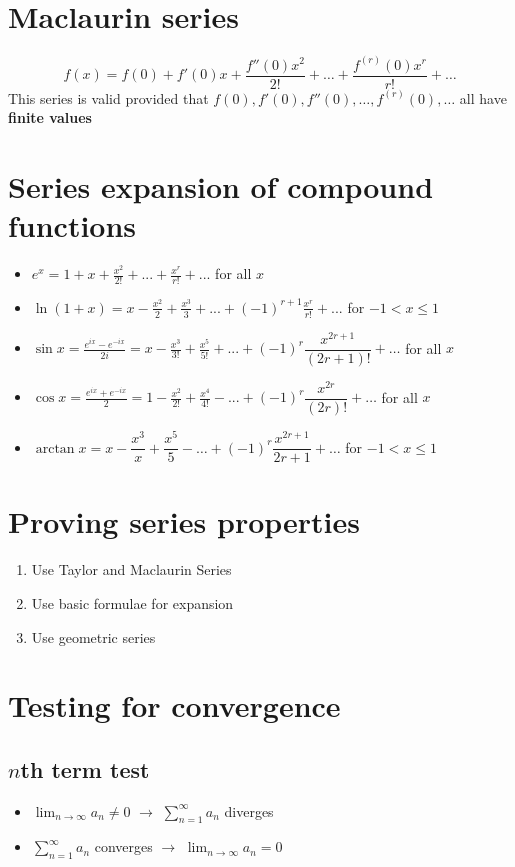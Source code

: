 \section{Maclaurin series}
$$f(x)=f(0)+f'(0)x+\frac{f''(0)x^2}{2!}+\dots+\frac{f^{(r)}(0)x^r}{r!}+\dots$$
This series is valid provided that $f(0), f'(0), f''(0),\dots,f^{(r)}(0),\dots$ all have \textbf{finite values}

\section{Series expansion of compound functions}
\begin{itemize}
    \item $e^{x}=1+x+\frac{x^{2}}{2!}+...+\frac{x^{r}}{r!}+...$ for all $x$
    \item $\ln(1+x) = x - \frac{x^{2}}{2} + \frac{x^{3}}{3} + ... + (-1)^{r+1}\frac{x^{r}}{r!} +...$ for $-1<x\leq1$
    \item $\sin x = \frac{e^{ix}-e^{-ix}}{2i}=x-\frac{x^{3}}{3!}+\frac{x^{5}}{5!}+...+(-1)^r\dfrac{x^{2r+1}}{(2r+1)!}+\dots$ for all $x$
    \item $\cos x = \frac{e^{ix}+e^{-ix}}{2}=1-\frac{x^{2}}{2!}+\frac{x^{4}}{4!}-...+(-1)^r\dfrac{x^{2r}}{(2r)!}+\dots$ for all $x$
    \item $\arctan x = x-\dfrac{x^3}{x}+\dfrac{x^5}{5}-\dots+(-1)^r\dfrac{x^{2r+1}}{2r+1}+\dots$ for $-1<x\leq1$
\end{itemize}

\section{Proving series properties}
\begin{enumerate}
    \item Use Taylor and Maclaurin Series
    \item Use basic formulae for expansion
    \item Use geometric series
\end{enumerate}

\section{Testing for convergence}
\subsection{$n$th term test}
\begin{itemize}
    \item $\lim_{n\rightarrow\infty}a_n \neq 0$ $\rightarrow$ $\sum_{n=1}^{\infty}a_n$ diverges
    \item $\sum_{n=1}^{\infty}a_n$ converges $\rightarrow$ $\lim_{n\rightarrow\infty}a_n = 0$
\end{itemize}

